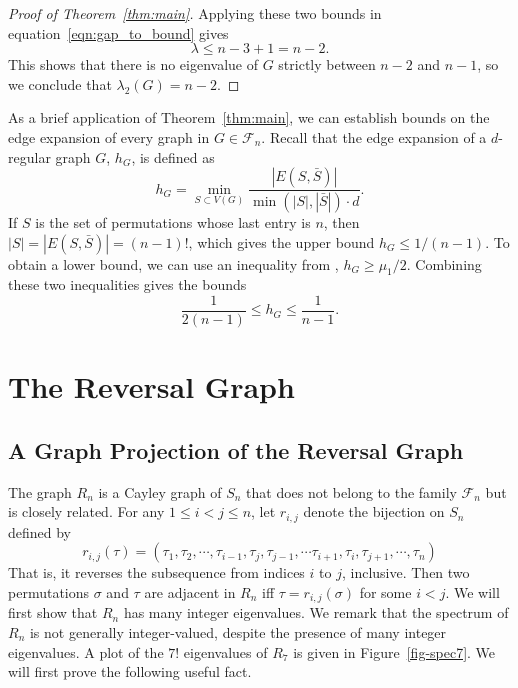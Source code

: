 \begin{proof}[Proof of Theorem~\ref{thm:main}]
  Applying these two bounds in equation~\ref{eqn:gap_to_bound} gives
  \[ \lambda \leq n-3 + 1 = n-2 . \]
  This shows that there is no eigenvalue of $G$ strictly between $n-2$ and $n-1$, so
  we conclude that  $\lambda_2(G) = n-2$.
\end{proof}


As a brief application of Theorem~\ref{thm:main}, we can establish bounds on the edge
expansion of every graph in $G \in \mathcal{F}_n$.  Recall that the edge
expansion of a $d$-regular graph $G$, $h_G$, is defined as
\[ h_G = \min_{S \subset V(G)} \frac{|E(S,\bar{S})|}{\min(|S|,|\bar{S}|) \cdot d} .\]
If $S$ is the set of permutations whose last entry is $n$, then
$|S| = |E(S,\bar{S})| = (n-1)!$, which gives the upper bound
$h_G \leq 1/(n-1)$.  To obtain a lower bound, we can use an inequality
from \cite{Chung1997},
$h_G \geq \mu_1 / 2$.   Combining these two inequalities gives the bounds
 \[ \frac{1}{2(n-1)} \leq h_G \leq \frac{1}{n-1} .\] 



\section{The Reversal Graph}\label{s6}

\subsection{A Graph Projection of the Reversal Graph}

The graph $R_n$ is a Cayley graph of $S_n$ that does not
belong to the family $\mathcal{F}_n$ but is closely related.  For any 
$1 \leq i<j \leq n$, let $r_{i,j}$ denote the bijection on $S_n$
defined by
 \[ r_{i,j}(\tau) =  (\tau_1, \tau_2, \cdots, \tau_{i-1}, \tau_{j}, \tau_{j-1}, \cdots \tau_{i+1}, \tau_i, \tau_{j+1}, \cdots , \tau_{n})\] 
That is, it reverses the subsequence from indices $i$ to $j$, inclusive.
Then two permutations $\sigma$ 
and $\tau$ are adjacent in $R_n$ iff $\tau = r_{i,j}(\sigma)$ for some $i< j$.  We will first  show that $R_n$ has many integer eigenvalues.  We remark that the spectrum of $R_n$ is not generally
integer-valued, despite the presence of many integer eigenvalues.  A plot of
the $7!$ eigenvalues of $R_7$ is given in Figure~\ref{fig-spec7}.  We will first prove the following useful fact.


